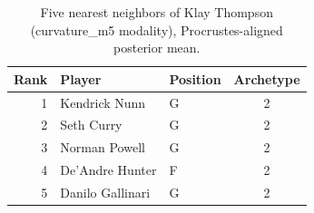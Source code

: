 \begin{table}[htbp]
  \centering\small
  \begin{tabular}{rllc}
    \toprule
    Rank & Player & Position & Archetype \\
    \midrule
    1 & Kendrick Nunn & G & 2 \\
    2 & Seth Curry & G & 2 \\
    3 & Norman Powell & G & 2 \\
    4 & De'Andre Hunter & F & 2 \\
    5 & Danilo Gallinari & G & 2 \\
    \bottomrule
  \end{tabular}
  \caption{Five nearest neighbors of Klay Thompson (curvature_m5 modality), Procrustes-aligned posterior mean.}
  \label{tab:Klay_Thompson_neighbors_curvature_m5}
\end{table}

